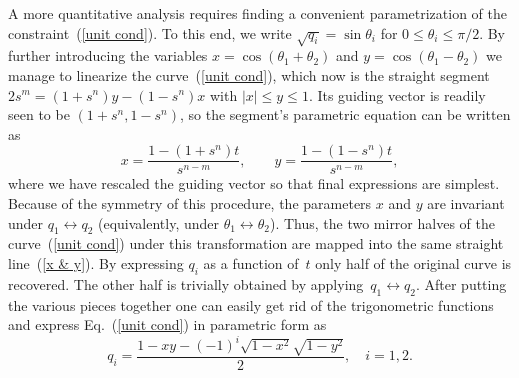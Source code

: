 \documentclass[aps,prl,twocolumn,showpacs]{revtex4}
\begin{document}
A more quantitative analysis requires finding a convenient parametrization of the {\color{red}constraint}~(\ref{unit cond}). To this end, we write $\sqrt{q_i} = \sin \theta_i$ for $0\leq \theta_i \leq \pi/2$. By further introducing the variables $x =\cos(\theta_1+\theta_2)$ and $y = \cos (\theta_1 - \theta_2)$ we manage to linearize the {\color{red}curve}~(\ref{unit cond}),
{\color{red}which now is the straight segment $2s^m=(1+s^n)y-(1-s^n)x$ with $|x| \le y\le 1$.  %
Its guiding vector is readily seen to be $(1+s^n,1-s^n)$, so the segment's parametric equation can be written as 
%
\begin{equation}
x=\frac{1-(1+s^n)t}{s^{n-m}},\qquad y=\frac{1-(1-s^n)t}{s^{n-m}},
\label{x & y}
\end{equation}
%
where we have rescaled the guiding vector so that final expressions are simplest. }
%
%
Because of the symmetry of this procedure, the parameters $x$ and $y$ are invariant under $q_1\leftrightarrow q_2$ (equivalently, under $\theta_1\leftrightarrow \theta_2$). Thus, the two mirror halves of the curve~(\ref{unit cond}) under this transformation are mapped into the same straight line~(\ref{x & y}). By expressing $q_i$ as a function of~$t$ only half of the original curve is recovered. The other half is trivially obtained by applying~$q_1\leftrightarrow q_2$.
%
After putting the various pieces together 
%
%
one  can easily get rid of the trigonometric functions and express Eq.~(\ref{unit cond}) in parametric form as 
%
\begin{equation}
q_i=\frac{1-xy-(-1)^i\sqrt{1-x^2}\sqrt{1-y^2}}{2} ,\quad i=1,2.
\label{par sqrt}
\end{equation}
%
\end{document}
